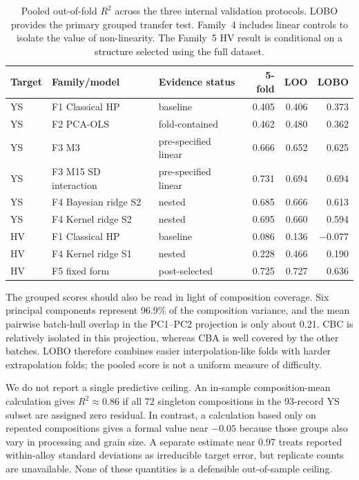 \documentclass[5p,times,twocolumn]{elsarticle}
\begin{document}
\begin{table}[t]
\centering
\caption{Pooled out-of-fold $R^2$ across the three internal validation protocols. LOBO provides the primary grouped transfer test. Family~4 includes linear controls to isolate the value of non-linearity. The Family~5 HV result is conditional on a structure selected using the full dataset.}
\label{tab:primary}
\footnotesize
\setlength{\tabcolsep}{3.8pt}
\begin{tabular}{lllrrr}
\toprule
Target & Family/model & Evidence status & 5-fold & LOO & LOBO \\
\midrule
YS & F1 Classical HP & baseline & 0.405 & 0.406 & 0.373 \\
YS & F2 PCA-OLS & fold-contained & 0.462 & 0.480 & 0.362 \\
YS & F3 M3 & pre-specified linear & 0.666 & 0.652 & 0.625 \\
YS & F3 M15 SD interaction & pre-specified linear & 0.731 & 0.694 & 0.694 \\
YS & F4 Bayesian ridge S2 & nested & 0.685 & 0.666 & 0.613 \\
YS & F4 Kernel ridge S2 & nested & 0.695 & 0.660 & 0.594 \\
HV & F1 Classical HP & baseline & 0.086 & 0.136 & $-0.077$ \\
HV & F4 Kernel ridge S1 & nested & 0.228 & 0.466 & 0.190 \\
HV & F5 fixed form & post-selected & 0.725 & 0.727 & 0.636 \\
\bottomrule
\end{tabular}
\end{table}

The grouped scores should also be read in light of composition coverage. Six principal components represent 96.9\% of the composition variance, and the mean pairwise batch-hull overlap in the PC1--PC2 projection is only about 0.21. CBC is relatively isolated in this projection, whereas CBA is well covered by the other batches. LOBO therefore combines easier interpolation-like folds with harder extrapolation folds; the pooled score is not a uniform measure of difficulty.

We do not report a single predictive ceiling. An in-sample composition-mean calculation gives $R^2\approx0.86$ if all 72 singleton compositions in the 93-record YS subset are assigned zero residual. In contrast, a calculation based only on repeated compositions gives a formal value near $-0.05$ because those groups also vary in processing and grain size. A separate estimate near 0.97 treats reported within-alloy standard deviations as irreducible target error, but replicate counts are unavailable. None of these quantities is a defensible out-of-sample ceiling.
\end{document}
